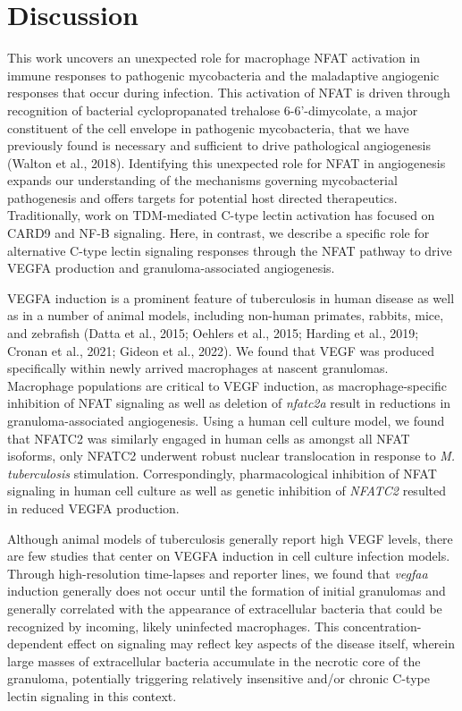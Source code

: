 \section{Discussion}

This work uncovers an unexpected role for macrophage NFAT activation in immune responses to pathogenic mycobacteria and the maladaptive angiogenic responses that occur during infection. This activation of NFAT is driven through recognition of bacterial  cyclopropanated trehalose 6-6'-dimycolate, a major constituent of the cell envelope in pathogenic mycobacteria, that we have previously found is necessary and sufficient to drive pathological angiogenesis (Walton et al., 2018). Identifying this unexpected role for NFAT in angiogenesis expands our understanding of the mechanisms governing mycobacterial pathogenesis and offers targets for potential host directed therapeutics. Traditionally, work on TDM-mediated C-type lectin activation has focused on CARD9 and NF-\textkappa B signaling. Here, in contrast, we describe a specific role for alternative C-type lectin signaling responses through the NFAT pathway to drive VEGFA production and granuloma-associated angiogenesis. 

VEGFA induction is a prominent feature of tuberculosis in human disease as well as in a number of animal models, including non-human primates, rabbits, mice, and zebrafish (Datta et al., 2015; Oehlers et al., 2015; Harding et al., 2019; Cronan et al., 2021; Gideon et al., 2022). We found that VEGF was produced specifically within newly arrived macrophages at nascent granulomas. Macrophage populations are critical to VEGF induction, as macrophage-specific inhibition of NFAT signaling as well as deletion of \textit{nfatc2a} result in reductions in granuloma-associated angiogenesis. Using a human cell culture model, we found that NFATC2 was similarly engaged in human cells as amongst all NFAT isoforms, only NFATC2 underwent robust nuclear translocation in response to \textit{M. tuberculosis} stimulation. Correspondingly, pharmacological inhibition of NFAT signaling in human cell culture as well as genetic inhibition of \textit{NFATC2} resulted in reduced VEGFA production.

Although animal models of tuberculosis generally report high VEGF levels, there are few studies that center on VEGFA induction in cell culture infection models. Through high-resolution time-lapses and reporter lines, we found that \textit{vegfaa} induction generally does not occur until the formation of initial granulomas and generally correlated with the appearance of extracellular bacteria that could be recognized by incoming, likely uninfected macrophages. This concentration-dependent effect on signaling may reflect key aspects of the disease itself, wherein large masses of extracellular bacteria accumulate in the necrotic core of the granuloma, potentially triggering relatively insensitive and/or chronic C-type lectin signaling in this context.

